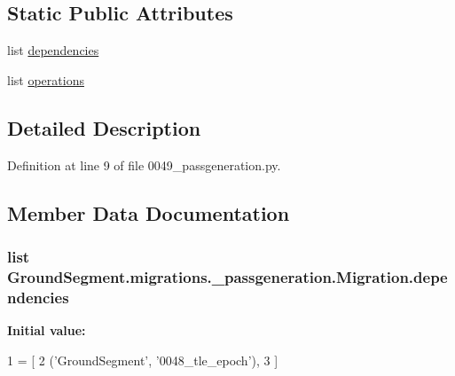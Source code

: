 \subsection*{Static Public Attributes}
\begin{DoxyCompactItemize}
\item 
list \hyperlink{class_ground_segment_1_1migrations_1_10049__passgeneration_1_1_migration_a6c3cd25763739883f8508906ccaa84df}{dependencies}
\item 
list \hyperlink{class_ground_segment_1_1migrations_1_10049__passgeneration_1_1_migration_a6c8adae701c04c70c5738eca3462cce1}{operations}
\end{DoxyCompactItemize}


\subsection{Detailed Description}


Definition at line 9 of file 0049\+\_\+passgeneration.\+py.



\subsection{Member Data Documentation}
\hypertarget{class_ground_segment_1_1migrations_1_10049__passgeneration_1_1_migration_a6c3cd25763739883f8508906ccaa84df}{}
\subsubsection[{dependencies}]{\setlength{\rightskip}{0pt plus 5cm}list Ground\+Segment.\+migrations.\+\_\+passgeneration.\+Migration.\+dependencies\hspace{0.3cm}{\ttfamily [static]}}\label{class_ground_segment_1_1migrations_1_10049__passgeneration_1_1_migration_a6c3cd25763739883f8508906ccaa84df}
{\bfseries Initial value\+:}
\begin{DoxyCode}
1 = [
2         (\textcolor{stringliteral}{'GroundSegment'}, \textcolor{stringliteral}{'0048\_tle\_epoch'}),
3     ]
\end{DoxyCode}


